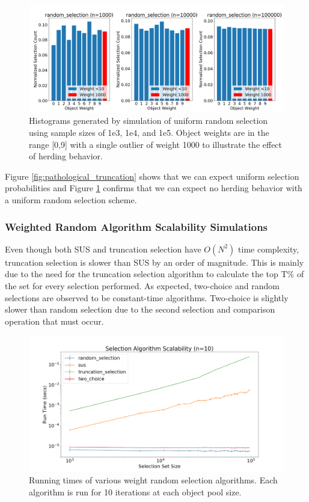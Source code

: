 \documentclass[12pt]{article}
\begin{document}
    \begin{figure}[h]
      \centering
      \includegraphics[scale=0.32]{images/pathological_random.png} 
      \caption{Histograms generated by simulation of uniform random selection
               using sample sizes of 1e3, 1e4, and 1e5. Object weights are in
               the range [0,9] with a single outlier of weight 1000 to
               illustrate the effect of herding behavior.}
      \label{fig:pathological_random}
    \end{figure}

    Figure \ref{fig:pathological_truncation} shows that we can expect uniform
    selection probabilities and Figure \ref{fig:pathological_random} confirms
    that we can expect no herding behavior with a uniform random selection
    scheme.

    \subsubsection{Weighted Random Algorithm Scalability Simulations}
    Even though both SUS and truncation selection have $O(N^2)$ time
    complexity, truncation selection is slower than SUS by an order of
    magnitude. This is mainly due to the need for the truncation selection
    algorithm to calculate the top T\% of the set for every selection
    performed. As expected, two-choice and random selections are observed to be
    constant-time algorithms. Two-choice is slightly slower than random
    selection due to the second selection and comparison operation that must
    occur.

    \begin{figure}[h]
      \centering
      \includegraphics[scale=0.28]{images/random_scalability.png} 
      \caption{Running times of various weight random selection algorithms.
               Each algorithm is run for 10 iterations at each object pool
               size.}
      \label{fig:random_scalability}
    \end{figure}
\end{document}
